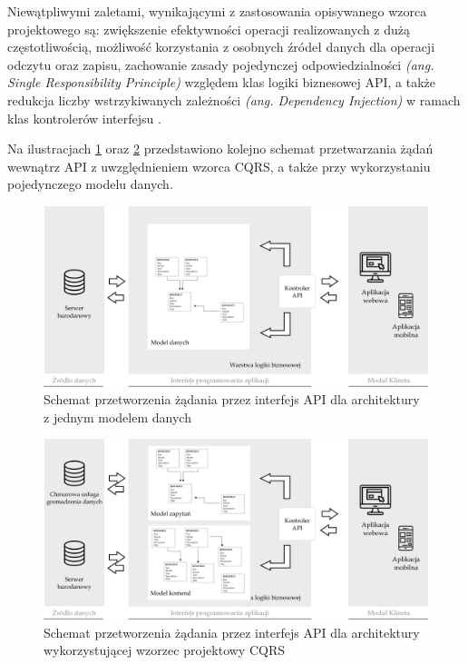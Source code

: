 Niewątpliwymi zaletami, wynikającymi z zastosowania opisywanego wzorca projektowego są: zwiększenie efektywności operacji realizowanych z dużą częstotliwością, możliwość korzystania z osobnych źródeł danych dla operacji odczytu oraz zapisu, zachowanie zasady pojedynczej odpowiedzialności \textit{(ang. Single Responsibility Principle)} względem klas logiki biznesowej API, a także redukcja liczby wstrzykiwanych zależności \textit{(ang. Dependency Injection)} w ramach klas kontrolerów interfejsu \cite{cs7194}.

Na ilustracjach \ref{fig:standard-vs-cqrs1} oraz \ref{fig:standard-vs-cqrs2} przedstawiono kolejno schemat przetwarzania żądań wewnątrz API z uwzględnieniem wzorca CQRS, a także przy wykorzystaniu pojedynczego modelu danych.

\begin{figure}[ht]
    \centering
     \includegraphics[width=0.9\linewidth]{rys02/standard-vs-cqrs1.png}
    \caption{Schemat przetworzenia żądania przez interfejs API dla architektury z jednym modelem danych}
    \label{fig:standard-vs-cqrs1}
   \end{figure}

   \begin{figure}[ht]
    \centering
     \includegraphics[width=0.9\linewidth]{rys02/standard-vs-cqrs2.png}
    \caption{Schemat przetworzenia żądania przez interfejs API dla architektury wykorzystującej wzorzec projektowy CQRS}
    \label{fig:standard-vs-cqrs2}
   \end{figure}


